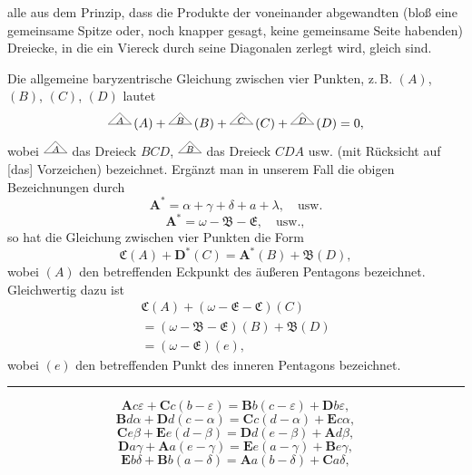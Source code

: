 alle aus dem Prinzip, dass die Produkte der voneinander abgewandten (bloß
eine gemeinsame Spitze oder, noch knapper gesagt, keine gemeinsame Seite
habenden) Dreiecke, in die ein Viereck durch seine Diagonalen zerlegt wird, gleich sind.

Die allgemeine baryzentrische Gleichung zwischen vier Punkten, z.\,B. $(A)$, $(B)$, $(C)$,
$(D)$ lautet
\[
\TriLetter{A}\,(A)+\TriLetter{B}\,(B)+\TriLetter{C}\,(C)+\TriLetter{D}\,(D)=0,
\]
wobei $\TriLetter{A}$ das Dreieck $BCD$, $\TriLetter{B}$ das Dreieck $CDA$
usw. (mit Rücksicht auf [das] Vorzeichen) bezeichnet. Ergänzt man in unserem
Fall die obigen Bezeichnungen durch
\[
\boldsymbol{A}^{*}=\alpha+\gamma+\delta+a+\lambda, \quad \text{usw.}
\]
\[
\boldsymbol{A}^{*}=\omega-\mathfrak{B}-\mathfrak{E}, \quad \text{usw.},
\]
so hat die Gleichung zwischen vier Punkten die Form
\[
\mathfrak{C}(A)+\boldsymbol{D}^{*}(C)=\boldsymbol{A}^{*}(B)+\mathfrak{B}(D),
\]
wobei $(A)$ den betreffenden Eckpunkt des äußeren Pentagons bezeichnet. Gleichwertig dazu ist
\[
\begin{gathered}\mathfrak{C}(A)+(\omega-\mathfrak{E}-\mathfrak{C})(C)\\=(\omega-\mathfrak{B}-\mathfrak{E})(B)+\mathfrak{B}(D)\\=(\omega-\mathfrak{E})(e),\end{gathered}
\]
wobei $(e)$ den betreffenden Punkt des inneren Pentagons bezeichnet.

\begin{center}\rule{3cm}{.4pt}\end{center}

\begin{center}\resizebox{7cm}{!}{}\end{center}

\[
\boldsymbol{A}c\varepsilon+\boldsymbol{C}c(b-\varepsilon)=\boldsymbol{B}b(c-\varepsilon)+\boldsymbol{D}b\varepsilon,
\]
\[
\boldsymbol{B}d\alpha+\boldsymbol{D}d(c-\alpha)=\boldsymbol{C}c(d-\alpha)+\boldsymbol{E}c\alpha,
\]
\[
\boldsymbol{C}e\beta+\boldsymbol{E}e(d-\beta)=\boldsymbol{D}d(e-\beta)+\boldsymbol{A}d\beta,
\]
\[
\boldsymbol{D}a\gamma+\boldsymbol{A}a(e-\gamma)=\boldsymbol{E}e(a-\gamma)+\boldsymbol{B}e\gamma,
\]
\[
\boldsymbol{E}b\delta+\boldsymbol{B}b(a-\delta)=\boldsymbol{A}a(b-\delta)+\boldsymbol{C}a\delta,
\]
